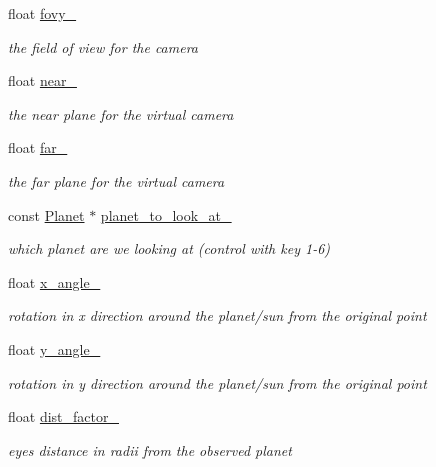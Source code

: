 \begin{DoxyCompactItemize}
float \hyperlink{classSolar__viewer_a0ee3e25d0a16f5f8f2be784b42a3b576}{fovy\+\_\+}
\begin{DoxyCompactList}\small\item\em the field of view for the camera \end{DoxyCompactList}\item 
float \hyperlink{classSolar__viewer_a58e1539134e5eb23ee851565ae8724f1}{near\+\_\+}
\begin{DoxyCompactList}\small\item\em the near plane for the virtual camera \end{DoxyCompactList}\item 
float \hyperlink{classSolar__viewer_ae47e94d8d1b6ee4297454d6234531d87}{far\+\_\+}
\begin{DoxyCompactList}\small\item\em the far plane for the virtual camera \end{DoxyCompactList}\item 
const \hyperlink{classPlanet}{Planet} $\ast$ \hyperlink{classSolar__viewer_af0b149d27213a8b45e5672c2e1d5b53a}{planet\+\_\+to\+\_\+look\+\_\+at\+\_\+}
\begin{DoxyCompactList}\small\item\em which planet are we looking at (control with key 1-\/6) \end{DoxyCompactList}\item 
float \hyperlink{classSolar__viewer_afe0f50221ea1464e4b1a9c79071bcac0}{x\+\_\+angle\+\_\+}
\begin{DoxyCompactList}\small\item\em rotation in x direction around the planet/sun from the original point \end{DoxyCompactList}\item 
float \hyperlink{classSolar__viewer_aec80e0da0a52b108b1b7223d2a974860}{y\+\_\+angle\+\_\+}
\begin{DoxyCompactList}\small\item\em rotation in y direction around the planet/sun from the original point \end{DoxyCompactList}\item 
float \hyperlink{classSolar__viewer_a7447e4773978c9391a2ab54a52b92b43}{dist\+\_\+factor\+\_\+}
\begin{DoxyCompactList}\small\item\em eye\textquotesingle{}s distance in radii from the observed planet \end{DoxyCompactList}\item 

\end{DoxyCompactItemize}
